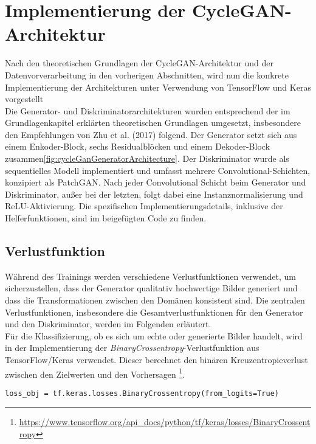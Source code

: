 \section{Implementierung der CycleGAN-Architektur}
Nach den theoretischen Grundlagen der CycleGAN-Architektur und der Datenvorverarbeitung in den vorherigen Abschnitten, wird nun die konkrete Implementierung der Architekturen unter Verwendung von TensorFlow und Keras vorgestellt 
\\
Die Generator- und Diskriminatorarchitekturen wurden entsprechend der im Grundlagenkapitel erklärten theoretischen Grundlagen umgesetzt, insbesondere den Empfehlungen von Zhu et al. (2017)\cite{Zhu.2017} folgend. Der Generator setzt sich aus einem Enkoder-Block, sechs Residualblöcken und einem Dekoder-Block zusammen\ref{fig:cycleGanGeneratorArchitecture}.
Der Diskriminator wurde als sequentielles Modell implementiert und umfasst mehrere Convolutional-Schichten, konzipiert als PatchGAN. 
Nach jeder Convolutional Schicht beim Generator und Diskriminator, außer bei der letzten, folgt dabei eine Instanznormalisierung und ReLU-Aktivierung.
Die spezifischen Implementierungsdetails, inklusive der Helferfunktionen, sind im beigefügten Code zu finden.

\subsection{Verlustfunktion}
Während des Trainings werden verschiedene Verlustfunktionen verwendet, um sicherzustellen, dass der Generator qualitativ hochwertige Bilder generiert und dass die Transformationen zwischen den Domänen konsistent sind. Die zentralen Verlustfunktionen, insbesondere die Gesamtverlustfunktionen für den Generator und den Diskriminator, werden im Folgenden erläutert. 
\\
Für die Klassifizierung, ob es sich um echte oder generierte Bilder handelt, wird in der Implementierung der \textit{BinaryCrossentropy}-Verlustfunktion aus TensorFlow/Keras verwendet. 
Dieser berechnet den binären Kreuzentropieverlust zwischen den Zielwerten und den Vorhersagen \footnote{\url{https://www.tensorflow.org/api_docs/python/tf/keras/losses/BinaryCrossentropy}}.

\begin{lstlisting}[language=pyhaff, caption={Initialisierung des BinaryCrossentropy-Verlustfunktion}, label={cod:binaryCrossentropy}]
loss_obj = tf.keras.losses.BinaryCrossentropy(from_logits=True)
\end{lstlisting}


